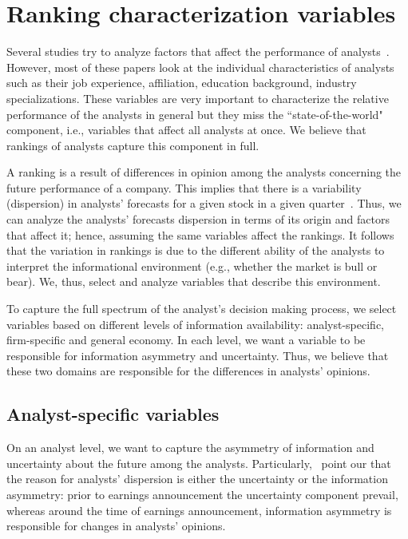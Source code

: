 \documentclass[12pt,a4paper]{article}\usepackage[]{graphicx}\usepackage[]{color}
\begin{document}
\section{Ranking characterization variables}
\label{ch3-sec:ind.var}
Several studies try to analyze  factors that affect the performance of analysts~\citep{clement1999,brown2003,jegadeesh2004}.  However, most of these papers look at the individual characteristics of analysts such as their job experience, affiliation,  education background, industry specializations. These variables are very important to characterize the relative performance of the analysts in general but they miss the ``state-of-the-world" component, i.e., variables that affect all analysts at once. We believe that rankings of analysts capture this component in full.

A ranking is a result of  differences in opinion among the analysts concerning the future performance of a company.  This implies that there is  a variability (dispersion) in analysts' forecasts for a given stock in a given quarter~\citep{diether2002}. Thus, we can analyze  the analysts' forecasts dispersion in terms of its origin and factors that affect it; hence, assuming the same variables affect the rankings. It follows that the variation in rankings is due to the different ability of the analysts to interpret the informational environment (e.g., whether the market is bull or bear). We, thus, select and analyze variables that describe this environment.

To capture the full spectrum of the analyst's decision making process, we select  variables based on different levels of information availability: analyst-specific,  firm-specific  and general economy. In each level, we want a variable to be responsible for information asymmetry and uncertainty. Thus, we believe that these two domains are responsible for the differences in analysts' opinions.

\subsection{Analyst-specific variables}
On an analyst level, we want to capture the asymmetry of information  and uncertainty about the future among the analysts. Particularly,~\cite{barron2009} point our that the reason for analysts' dispersion is either the uncertainty or the information asymmetry: prior to earnings announcement the uncertainty component prevail, whereas around the time of earnings announcement, information asymmetry is responsible for changes in analysts' opinions.
\end{document}
